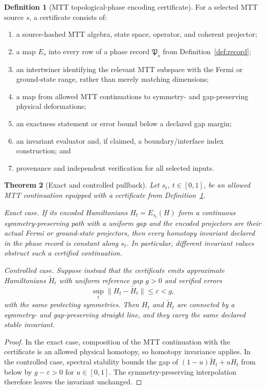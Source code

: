 \documentclass[11pt]{article}
\newtheorem{theorem}{Theorem}[section]
\theoremstyle{definition}
\newtheorem{definition}[theorem]{Definition}
\theoremstyle{remark}
\begin{document}
\begin{definition}[MTT topological-phase encoding certificate]
\label{def:certificate}
For a selected MTT source \(s\), a certificate consists of:
\begin{enumerate}[label=(C\arabic*)]
\item a source-hashed MTT algebra, state space, operator, and coherent
  projector;
\item a map \(E_s\) into every row of a phase record
  \(\mathfrak P_s\) from Definition~\ref{def:record};
\item an intertwiner identifying the relevant MTT subspace with the Fermi
  or ground-state range, rather than merely matching dimensions;
\item a map from allowed MTT continuations to symmetry- and gap-preserving
  physical deformations;
\item an exactness statement or error bound below a declared gap margin;
\item an invariant evaluator and, if claimed, a boundary/interface index
  construction; and
\item provenance and independent verification for all selected inputs.
\end{enumerate}
\end{definition}

\begin{theorem}[Exact and controlled pullback]
\label{thm:pullback}
Let \(s_t\), \(t\in[0,1]\), be an allowed MTT continuation equipped with a
certificate from Definition~\ref{def:certificate}.

\emph{Exact case.}  If its encoded Hamiltonians \(H_t=E_{s_t}(H)\) form a
continuous symmetry-preserving path with a uniform gap and the encoded
projectors are their actual Fermi or ground-state projectors, then every
homotopy invariant declared in the phase record is constant along \(s_t\).
In particular, different invariant values obstruct such a certified
continuation.

\emph{Controlled case.}  Suppose instead that the certificate emits
approximate Hamiltonians \(\widetilde H_t\) with uniform reference gap
\(g>0\) and verified errors
\[
 \sup_t\|H_t-\widetilde H_t\|\leq\varepsilon<g,
\]
with the same protecting symmetries.  Then \(H_t\) and
\(\widetilde H_t\) are connected by a symmetry- and gap-preserving straight
line, and they carry the same declared stable invariant.
\end{theorem}

\begin{proof}
In the exact case, composition of the MTT continuation with the certificate
is an allowed physical homotopy, so homotopy invariance applies.  In the
controlled case, spectral stability bounds the gap of
\((1-u)\widetilde H_t+uH_t\) from below by \(g-\varepsilon>0\) for
\(u\in[0,1]\).  The symmetry-preserving interpolation therefore leaves the
invariant unchanged.
\end{proof}
\end{document}
